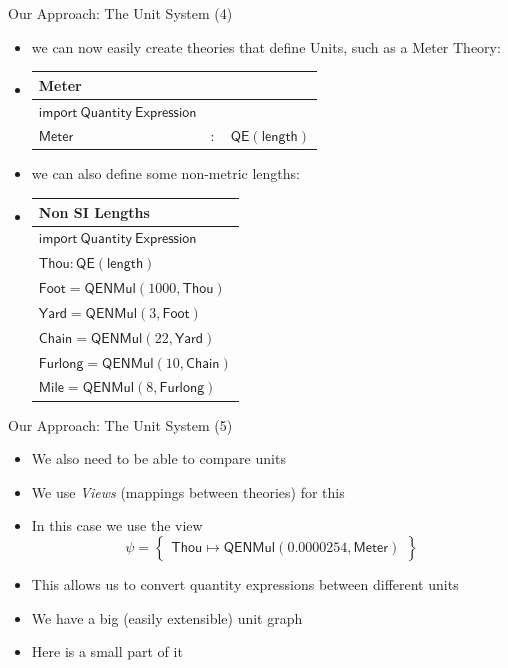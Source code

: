 \documentclass{beamer}
\begin{document}
  \begin{frame}{Our Approach: The Unit System (4)}
    \begin{itemize}[<+->]
      \item we can now easily create theories that define Units, such as a Meter Theory:
      \item
          \begin{tabular}{|l l l|}
            \hline
            \textsf{Meter} &&\\\hline
            $ \mathsf{import \ Quantity\ Expression}$ &&\\
            \hline
            $\mathsf{Meter}$ & $:$ & $ \mathsf{QE} \left( \mathsf{length} \right)$\\\hline
          \end{tabular}
    \item we can also define some non-metric lengths:
    \item
      \begin{tabular}{|l|}
        \hline
        \textsf{Non SI Lengths}\\\hline
        $ \mathsf{import \ Quantity\ Expression}$\\
        \hline
        $\mathsf{Thou} : \mathsf{QE}\left( \mathsf{length} \right)$\\
        $\mathsf{Foot} = \mathsf{QENMul} \left( 1000, \mathsf{Thou} \right)$\\
        $\mathsf{Yard} = \mathsf{QENMul} \left( 3, \mathsf{Foot} \right)$\\
        $\mathsf{Chain} = \mathsf{QENMul} \left( 22, \mathsf{Yard} \right)$\\
        $\mathsf{Furlong} = \mathsf{QENMul} \left( 10, \mathsf{Chain} \right)$\\
        $\mathsf{Mile} = \mathsf{QENMul} \left( 8, \mathsf{Furlong} \right)$\\
        \hline
      \end{tabular}
    \end{itemize}
  \end{frame}

  \begin{frame}{Our Approach: The Unit System (5)}
    \begin{itemize}[<+->]
      \item We also need to be able to compare units
      \item We use \textit{Views} (mappings between theories) for this
      \item In this case we use the view
        \[
          \psi = \left\{\begin{array}{l}
            \mathsf{Thou} \mapsto \mathsf{QENMul} \left( 0.0000254, \mathsf{Meter} \right)
          \end{array}\right\}
        \]
      \item This allows us to convert quantity expressions between different units
      \item We have a big (easily extensible) unit graph
      \item Here is a small part of it
    \end{itemize}
  \end{frame}
\end{document}
